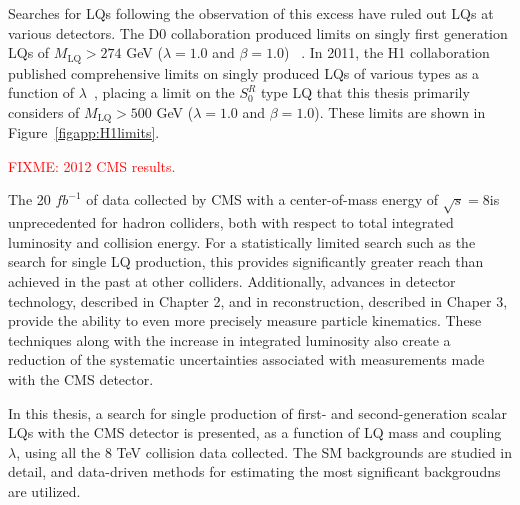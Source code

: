 Searches for LQs following the observation of this excess have ruled out LQs at various detectors.  The D$0$ collaboration produced limits on singly first generation LQs of $M_{\text{LQ}} > 274$ GeV ($\lambda=1.0$ and $\beta=1.0$) ~\cite{Abazov:2006ej}.  In 2011, the H1 collaboration published comprehensive limits on singly produced LQs of various types as a function of $\lambda$~\cite{Collaboration:2011qaa}, placing a limit on the $S^{R}_{0}$ type LQ that this thesis primarily considers of  $M_{\text{LQ}} > 500$ GeV ($\lambda=1.0$ and $\beta=1.0$).  These limits are shown in Figure~\ref{figapp:H1limits}.  


\textcolor{red}{FIXME: 2012 CMS results.}  %

The 20 $fb^{-1}$ of data collected by CMS with a center-of-mass energy of $\sqrt{s}=8$\TeV is unprecedented for hadron colliders, both with respect to total integrated luminosity and collision energy.  For a statistically limited search such as the search for single LQ production, this provides significantly greater reach than achieved in the past at other colliders.  Additionally, advances in detector technology, described in Chapter 2, and in reconstruction, described in Chaper 3, provide the ability to even more precisely measure particle kinematics.  These techniques along with the increase in integrated luminosity also create a reduction of the systematic uncertainties associated with measurements made with the CMS detector.  

In this thesis, a search for single production of first- and second-generation scalar LQs with the CMS detector is presented, as a function of LQ mass and coupling $\lambda$, using all the 8 TeV collision data collected.  The SM backgrounds are studied in detail, and data-driven methods for estimating the most significant backgroudns are utilized.  


